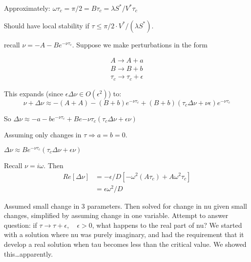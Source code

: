 Approximately: $\omega\tau_c = \pi/2 = B\tau_c = \lambda S^*/V^*\tau_c$

Should have local stability if $\tau \le \pi/2 \cdot V^*/(\lambda S^*)$.

\vbox{}

recall $\nu = - A - B e^{-\nu\tau_c}$. Suppose we make perturbations in the form 

\begin{align*}A
  \rightarrow A+a\\B\rightarrow B+b\\ \tau_c\rightarrow \tau_c + \epsilon
\end{align*}

This expands (since $\epsilon\Delta\nu\in O(\epsilon^2)$) to:
\[ \nu + \Delta\nu \approx -(A+A) - (B+b)e^{-\nu\tau_c} + (B+b)(\tau_c \Delta \nu +\nu\epsilon)e^{-\nu\tau_c}\]

So $\Delta\nu\approx -a-be^{-\nu\tau_c}+ Be{-\nu\tau_c}(\tau_c\Delta\nu+\epsilon\nu)$

Assuming only changes in $\tau \Rightarrow a=b=0$.

$\Delta\nu\approx Be^{-\nu\tau_c}(\tau_c\Delta\nu+\epsilon\nu)$


Recall $\nu = i\omega$. Then
\begin{align*}
  Re[\Delta\nu] &= -\epsilon/D [-\omega^2(A\tau_c)+A\omega^2\tau_c]\\
  &= \epsilon\omega^2/D
\end{align*}


Assumed small change in 3 parameters. Then solved for change in nu given small changes, simplified by assuming change in one variable. Attempt to answer question: if $\tau\rightarrow\tau+\epsilon,\quad\epsilon>0$, what happens to the real part of nu? We started with a solution where nu was purely imaginary, and had the requirement that it develop a real solution when tau becomes less than the critical value. We showed this\dots apparently.
